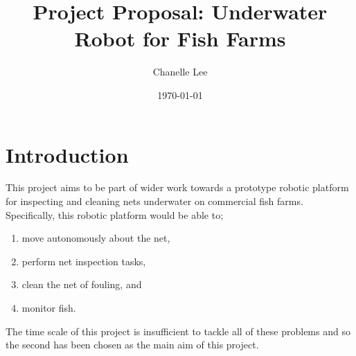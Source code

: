 \documentclass[11.5pt, twoside, a4paper]{article}
\begin{document}
\title{Project Proposal: Underwater Robot for Fish Farms}
\author{Chanelle Lee}
\date{\today}
\maketitle

\section{Introduction}
This project aims to be part of wider work towards a prototype robotic platform for inspecting and cleaning nets underwater on commercial fish farms. Specifically, this robotic platform would be able to;
\begin{enumerate}
\item move autonomously about the net,
\item perform net inspection tasks,
\item clean the net of fouling, and
\item monitor fish.
\end{enumerate}
The time scale of this project is insufficient to tackle all of these problems and so the second has been chosen as the main aim of this project.
\end{document}
